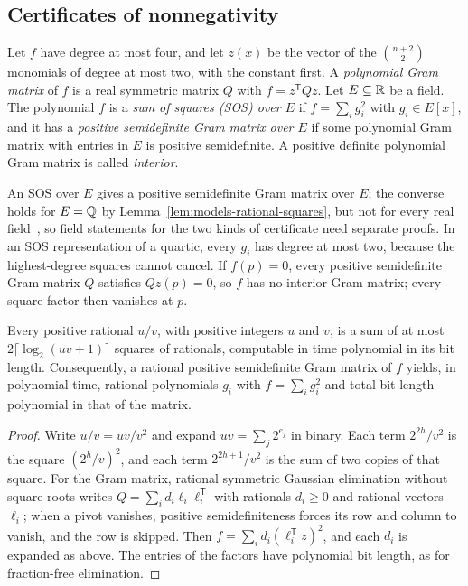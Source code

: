 \subsection{Certificates of nonnegativity}
\label{sec:models-certificates}

\begin{definition}
\label{def:models-sos}
Let $f$ have degree at most four, and let $z(x)$ be the vector of the
$\binom{n+2}{2}$ monomials of degree at most two, with the constant first.
A \emph{polynomial Gram matrix} of $f$ is a real symmetric matrix $Q$ with
$f=z^{\mathsf T}Qz$. Let $E\subseteq\mathbb R$ be a field. The polynomial $f$ is
a \emph{sum of squares (SOS) over $E$} if $f=\sum_ig_i^2$ with $g_i\in E[x]$,
and it has a \emph{positive semidefinite Gram matrix over $E$} if some
polynomial Gram matrix with entries in $E$ is positive semidefinite. A
positive definite polynomial Gram matrix is called \emph{interior}.
\end{definition}

An SOS over $E$ gives a positive semidefinite Gram matrix over $E$; the
converse holds for $E=\mathbb Q$ by Lemma~\ref{lem:models-rational-squares}, but not
for every real field~\cite{ChuaPlaumannSinnVinzant2017}, so field statements
for the two kinds of certificate need separate proofs. In an SOS
representation of a quartic, every $g_i$ has degree at most two, because the
highest-degree squares cannot cancel. If $f(p)=0$, every positive
semidefinite Gram matrix $Q$ satisfies $Qz(p)=0$, so $f$ has no interior
Gram matrix; every square factor then vanishes at $p$.

\begin{lemma}
\label{lem:models-rational-squares}
Every positive rational $u/v$, with positive integers $u$ and $v$, is a sum
of at most $2\lceil\log_2(uv+1)\rceil$ squares of rationals, computable in time
polynomial in its bit length. Consequently, a rational positive semidefinite
Gram matrix of $f$ yields, in polynomial time, rational polynomials $g_i$ with
$f=\sum_ig_i^2$ and total bit length polynomial in that of the matrix.
\end{lemma}

\begin{proof}
Write $u/v=uv/v^2$ and expand $uv=\sum_j2^{e_j}$ in binary. Each term
$2^{2h}/v^2$ is the square $(2^h/v)^2$, and each term $2^{2h+1}/v^2$ is the sum
of two copies of that square. For the Gram matrix, rational symmetric
Gaussian elimination without square roots writes
$Q=\sum_id_i\ell_i\ell_i^{\mathsf T}$ with rationals $d_i\ge0$ and rational
vectors $\ell_i$; when a pivot vanishes, positive semidefiniteness forces its
row and column to vanish, and the row is skipped. Then
$f=\sum_id_i(\ell_i^{\mathsf T}z)^2$, and each $d_i$ is expanded as above.
The entries of the factors have polynomial bit length, as for fraction-free
elimination.
\end{proof}

